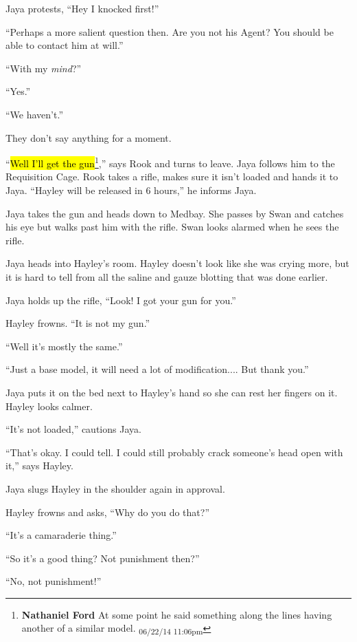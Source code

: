 Jaya protests, ``Hey I knocked first!''

``Perhaps a more salient question then. Are you not his Agent?  You should be able to contact him at will.''

``With my \textit{mind}?''

``Yes.''

``We haven't.''

They don't say anything for a moment.

``\hl{Well I'll get the gun}\footnote{\textbf{Nathaniel Ford }At some point he said something along the lines having another of a similar model. \textsubscript{06/22/14 11:06pm}},'' says Rook and turns to leave.  Jaya follows him to the Requisition Cage.  Rook takes a rifle, makes sure it isn't loaded and hands it to Jaya.  ``Hayley will be released in 6 hours,'' he informs Jaya.





Jaya takes the gun and heads down to Medbay.  She passes by Swan and catches his eye but walks past him with the rifle.  Swan looks alarmed when he sees the rifle.



Jaya heads into Hayley's room.  Hayley doesn't look like she was crying more, but it is hard to tell from all the saline and gauze blotting that was done earlier.

Jaya holds up the rifle, ``Look!  I got your gun for you.''

Hayley frowns.  ``It is not my gun.''

``Well it's mostly the same.''

``Just a base model, it will need a lot of modification.... But thank you.''

Jaya puts it on the bed next to Hayley's hand so she can rest her fingers on it.  Hayley looks calmer.  

``It's not loaded,'' cautions Jaya.

``That's okay.  I could tell.   I could still probably crack someone's head open with it,'' says Hayley.

Jaya slugs Hayley in the shoulder again in approval.

Hayley frowns and asks, ``Why do you do that?''

``It's a camaraderie thing.''

``So it's a good thing?  Not punishment then?''

``No, not punishment!''

